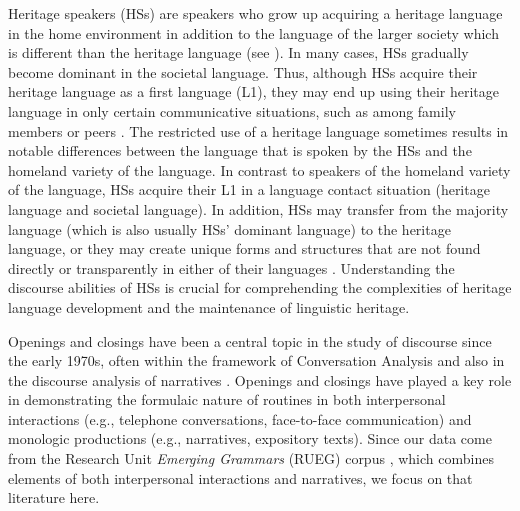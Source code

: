 \documentclass[output=paper,colorlinks,citecolor=brown]{langscibook}
\begin{document}
Heritage speakers (HSs) are speakers who grow up acquiring a heritage language in the home environment in addition to the language of the larger society which is different than the heritage language (see \cite{chapters/02}). In many cases, HSs gradually become dominant in the societal language. Thus, although HSs acquire their heritage language as a first language (L1), they may end up using their heritage language in only certain communicative situations, such as among family members or peers \parencite[see e.g.][] {rothman_understanding_2009,montrul_dominant_2012,polinsky_heritage_2018,tsehaye_deconstructing_2021}. The restricted use of a heritage language sometimes results in notable differences between the language that is spoken by the HSs and the homeland variety of the language. In contrast to speakers of the homeland variety of the language, HSs acquire their L1 in a language contact situation (heritage language and societal language). In addition, HSs may transfer from the majority language (which is also usually HSs’ dominant language) to the heritage language, or they may create unique forms and structures that are not found directly or transparently in either of their languages \parencite[see][] {polinsky_heritage_2018,ozsoy_shifting_2022}. Understanding the discourse abilities of HSs is crucial for comprehending the complexities of heritage language development and the maintenance of linguistic heritage. 

Openings and closings have been a central topic in the study of discourse since the early 1970s, often within the framework of Conversation Analysis \parencite[see review in][] {schegloff_sequence_2007} and also in the discourse analysis of narratives \parencite[e.g.][] {tolchinsky_text_2002}. Openings and closings have played a key role in demonstrating the formulaic nature of routines in both interpersonal interactions (e.g., telephone conversations, face-to-face communication) and monologic productions (e.g., narratives, expository texts). Since our data come from the Research Unit \textit{Emerging Grammars} (RUEG) corpus \parencite{wiese_heritage_2021}, which combines elements of both interpersonal interactions and narratives, we focus on that literature here.
\end{document}
